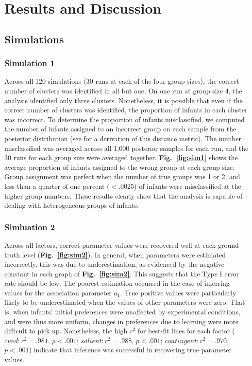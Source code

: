 \documentclass[12pt]{article}
\begin{document}
\section*{Results and Discussion}

\subsection*{Simulations}

\subsubsection*{Simulation 1}

	Across all 120 simulations (30 runs at each of the four group sizes), the correct number of clusters was identified in all but one. On one run at group size 4, the analysis identified only three clusters. Nonetheless, it is possible that even if the correct number of clusters was identified, the proportion of infants in each cluster was incorrect. To determine the proportion of infants misclassified, we computed the number of infants assigned to an incorrect group on each sample from the posterior distribution (see \cite{Cha2002} for a derivation of this distance metric). The number misclassified was averaged across all 1,000 posterior samples for each run, and the 30 runs for each group size were averaged together. \textbf{Fig.~\ref{fig:sim1}} shows the average proportion of infants assigned to the wrong group at each group size. Group assignment was perfect when the number of true groups was 1 or 2, and less than a quarter of one percent ($< .0025$) of infants were misclassified at the higher group numbers. These results clearly show that the analysis is capable of dealing with heterogeneous groups of infants.

\subsubsection*{Simluation 2}

	Across all factors, correct parameter values were recovered well at each ground-truth level (\textbf{Fig.~\ref{fig:sim2}}). In general, when parameters were estimated incorrectly, this was due to underestimation, as evidenced by the negative constant in each graph of \textbf{Fig.~\ref{fig:sim2}}. This suggests that the Type I error rate should be low. The poorest estimation occurred in the case of inferring values for the association parameter $a_{1}$. True positive values were particularly likely to be underestimated when the values of other parameters were zero. That is, when infants' initial preferences were unaffected by experimental conditions, and were thus more uniform, changes in preferences due to learning were more difficult to pick up. Nonetheless, the high $r^{2}$ for best-fit lines for each factor ($cued: r^{2}  = .981$, $p < .001$; $salient: r^{2}  = .988$, $p < .001$; $contingent: r^{2} = .970$, $p < .001$) indicate that inference was successful in recovering true parameter values.
\end{document}

